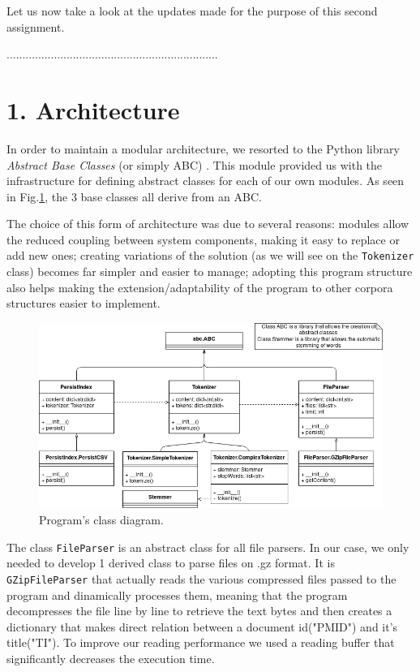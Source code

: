 \documentclass[12pt]{article}
\begin{document}
Let us now take a look at the updates made for the purpose of this second 
assignment.

...................................................................


\section*{1. Architecture}

In order to maintain a modular architecture, we resorted to the Python library 
{\it Abstract Base Classes\/} (or simply ABC) \cite{abclib}.
This module provided us with the infrastructure for defining abstract classes
for each of our own modules.
As seen in Fig.\ref{fig:classdiagram}, the 3 base classes all derive from 
an ABC.

The choice of this form of architecture was due to several reasons: modules
allow the reduced coupling between system components, making it easy to replace
or add new ones; creating variations of the solution (as we will see on the
\texttt{Tokenizer} class) becomes far simpler and easier to manage; adopting this 
program structure also helps making the extension/adaptability of the 
program to other corpora structures easier to implement.

\begin{figure}[h!]
  \includegraphics[width=\linewidth]{ClassDiagram.png}
  \caption{Program's class diagram.}
  \label{fig:classdiagram}
\end{figure}

The class \texttt{FileParser} is an abstract class for all file parsers.
In our case, we only needed to develop 1 derived class to parse files on
.gz format. 
It is \texttt{GZipFileParser} that actually reads the various compressed 
files passed to the program and dinamically processes them, meaning that
the program decompresses the file line by line to retrieve the text bytes 
and then creates a dictionary that makes direct relation between a document 
id("PMID") and it's title("TI").
To improve our reading performance we used a reading buffer that 
significantly decreases the execution time. 
\end{document}
